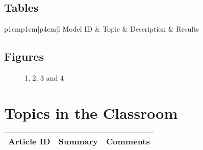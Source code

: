 \subsection{Tables}

\centering	
\begin{table}[H]\tiny
	\caption{}	
	\begin{tabular}{p{1cm}p{1cm}|p{4cm}|l}
		\hline	
		Model ID & Topic & Description & Results \\
		\hline 
		\hline 
	\end{tabular}
\end{table}


\subsection{Figures}

\begin{figure}[H]
	\centering
	\begin{minipage}[b]{0.5\linewidth}
	\end{minipage}\hfill
	\begin{minipage}[b]{0.5\linewidth}
	\end{minipage}\hfill	
	\begin{minipage}[b]{0.5\linewidth}
	\end{minipage}\hfill
	\begin{minipage}[b]{0.5\linewidth}
	\end{minipage}\hfill
	\caption{1, 2, 3 and 4}
	\label{fig:Figure1}
\end{figure} 


\section{Topics in the Classroom}

\begin{table}[H]\centering
	\begin{tabular}{p{1cm}p{4cm}p{3cm}}
		Article ID & Summary & Comments\\
		\hline
		\hline
	\end{tabular}
\end{table}


